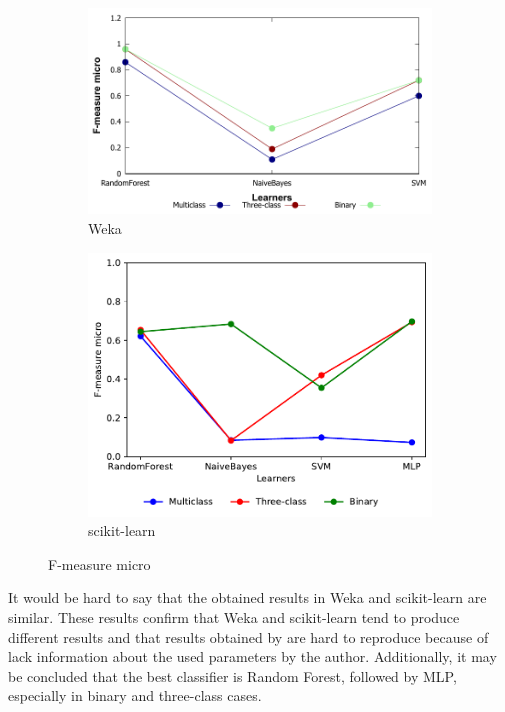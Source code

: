 \begin{figure}[H]
    \centering
    \begin{subfigure}[t]{0.5\textwidth}
        \includegraphics[width=\linewidth]{images/weka_f1micro}
        \caption{Weka}
    \end{subfigure}%
    \begin{subfigure}[t]{0.42\textwidth}
        \includegraphics[width=\linewidth, page = 1]{images/fmeasure}
        \caption{scikit-learn}
    \end{subfigure}
    \caption{F-measure micro}
    \label{fig:f1_micro}
\end{figure}


It would be hard to say that the obtained results in Weka and scikit-learn are similar. These results confirm that Weka and scikit-learn tend to produce different results and that  results obtained by \cite{borges_hink_machine_2014-1} are hard to reproduce because of lack information about the used parameters by the author. Additionally, it may be concluded that the best classifier is Random Forest, followed by MLP, especially in binary and three-class cases. 

